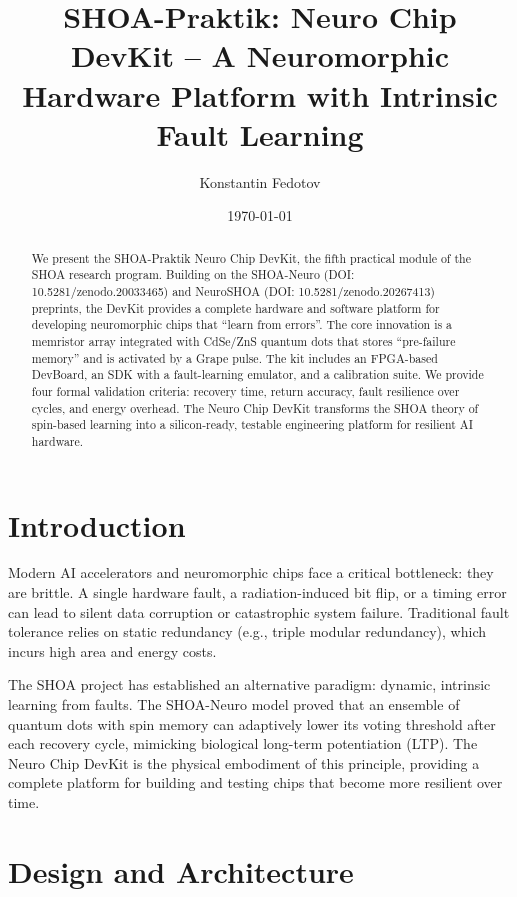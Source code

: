 \documentclass[12pt]{article}
\title{SHOA-Praktik: Neuro Chip DevKit -- A Neuromorphic Hardware Platform with Intrinsic Fault Learning}
\author{Konstantin Fedotov}
\date{\today}
\begin{document}
\maketitle

\begin{abstract}
We present the SHOA-Praktik Neuro Chip DevKit, the fifth practical module of the SHOA research program. Building on the SHOA-Neuro (DOI: 10.5281/zenodo.20033465) and NeuroSHOA (DOI: 10.5281/zenodo.20267413) preprints, the DevKit provides a complete hardware and software platform for developing neuromorphic chips that ``learn from errors''. The core innovation is a memristor array integrated with CdSe/ZnS quantum dots that stores ``pre-failure memory'' and is activated by a Grape pulse. The kit includes an FPGA-based DevBoard, an SDK with a fault-learning emulator, and a calibration suite. We provide four formal validation criteria: recovery time, return accuracy, fault resilience over cycles, and energy overhead. The Neuro Chip DevKit transforms the SHOA theory of spin-based learning into a silicon-ready, testable engineering platform for resilient AI hardware.
\end{abstract}

\section{Introduction}
Modern AI accelerators and neuromorphic chips face a critical bottleneck: they are brittle. A single hardware fault, a radiation-induced bit flip, or a timing error can lead to silent data corruption or catastrophic system failure. Traditional fault tolerance relies on static redundancy (e.g., triple modular redundancy), which incurs high area and energy costs.

The SHOA project has established an alternative paradigm: dynamic, intrinsic learning from faults. The SHOA-Neuro model proved that an ensemble of quantum dots with spin memory can adaptively lower its voting threshold after each recovery cycle, mimicking biological long-term potentiation (LTP). The Neuro Chip DevKit is the physical embodiment of this principle, providing a complete platform for building and testing chips that become more resilient over time.

\section{Design and Architecture}
\end{document}
